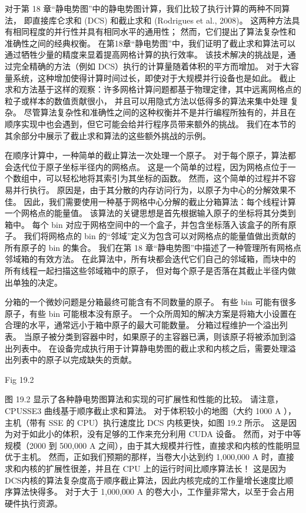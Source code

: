 对于第 18 章“静电势图”中的静电势图计算，我们比较了执行计算的两种不同算法，
即直接库仑求和 (DCS) 和截止求和 (Rodrigues et al., 2008)。 
这两种方法具有相同程度的并行性并具有相同水平的通用性； 然而，它们提出了算法复杂性和准确性之间的经典权衡。 
在第18章“静电势图”中，我们证明了截止求和算法可以通过牺牲少量的精度来显着提高网格计算的执行效率。 
该技术解决的挑战是，通过完全精确的方法（例如 DCS）执行的计算量随着体积的平方而增加。 
对于大容量系统，这种增加使得计算时间过长，即使对于大规模并行设备也是如此。 
截止求和方法基于这样的观察：许多网格计算问题都基于物理定律，其中远离网格点的粒子或样本的数值贡献很小，
并且可以用隐式方法以低得多的算法来集中处理 复杂。 
尽管算法复杂性和准确性之间的这种权衡并不是并行编程所独有的，并且在顺序实现中也会遇到，但它可能会给并行程序员带来额外的挑战。 
我们在本节的其余部分中展示了截止求和算法的这些额外挑战的示例。

在顺序计算中，一种简单的截止算法一次处理一个原子。 对于每个原子，算法都会迭代位于原子坐标半径内的网格点。 
这是一个简单的过程，因为网格点位于一个数组中，可以轻松地将其索引为其坐标的函数。 然而，这个简单的过程并不容易并行执行。 
原因是，由于其分散的内存访问行为，以原子为中心的分解效果不佳。 
因此，我们需要使用一种基于网格中心分解的截止分箱算法：每个线程计算一个网格点的能量值。 
该算法的关键思想是首先根据输入原子的坐标将其分类到箱中。 
每个 bin 对应于网格空间中的一个盒子，并包含坐标落入该盒子的所有原子。 
我们将网格点的 bin 的“邻域”定义为包含可以对网格点的能量值做出贡献的所有原子的 bin 的集合。 
我们在第 18 章“静电势图”中描述了一种管理所有网格点邻域箱的有效方法。 
在此算法中，所有块都会迭代它们自己的邻域箱，而块中的所有线程一起扫描这些邻域箱中的原子，
但对每个原子是否落在其截止半径内做出单独的决定。

分箱的一个微妙问题是分箱最终可能含有不同数量的原子。 有些 bin 可能有很多原子，有些 bin 可能根本没有原子。 
一个众所周知的解决方案是将箱大小设置在合理的水平，通常远小于箱中原子的最大可能数量。 分箱过程维护一个溢出列表。 
当原子被分类到容器中时，如果原子的主容器已满，则该原子将被添加到溢出列表中。 
在设备完成执行用于计算静电势图的截止求和内核之后，需要处理溢出列表中的原子以完成缺失的贡献。

{\color{red} Fig 19.2}

图 19.2 显示了各种静电势图算法和实现的可扩展性和性能的比较。 请注意，CPUSSE3 曲线基于顺序截止求和算法。 
对于体积较小的地图（大约 1000 A ），主机（带有 SSE 的 CPU）执行速度比 DCS 内核更快，如图 19.2 所示。 
这是因为对于如此小的体积，没有足够的工作来充分利用 CUDA 设备。 
然而，对于中等规模（2000 到 500,000 A 之间），由于其大规模并行性，直接求和内核的性能明显优于主机。 
然而，正如我们预期的那样，当卷大小达到约 1,000,000 A 时，直接求和内核的扩展性很差，并且在 CPU 上的运行时间比顺序算法长！ 
这是因为DCS内核的算法复杂度高于顺序截止算法，因此内核完成的工作量增长速度比顺序算法快得多。 
对于大于 1,000,000 A 的卷大小，工作量非常大，以至于会占用硬件执行资源。

